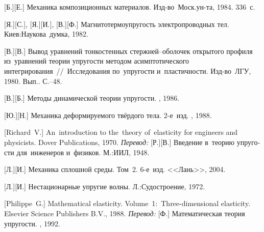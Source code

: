 \begin{thebibliography}{123}
\begin{otherlanguage}{russian}
[Б.][Е.] Механика композиционных материалов. Изд\hbox{-}во~Моск.\:ун\hbox{-}та, 1984. 336~с.

[Я.][С.], [Я.][И.], [В.][Ф.] Магнито\-термо\-упру\-гость электропроводных тел. Киев:\;Наукова~думка, 1982. 

[В.][В.] Вывод уравнений тонко\-стен\-ных стержней\hbox{--}обо\-ло\-чек открытого профиля из~уравнений теории упругости методом асимптотического интегрирования~//~Исследования по~упругости и~пластичности. Изд\hbox{-}во~ЛГУ, 1980. Вып.. С.\hbox{--}48.

[В.][Б.] Методы динамической теории упругости. \naukapublisher, 1986. 

[Ю.][Н.] Механика деформируемого твёрдого тела. 2\hbox{-}е~изд. \naukapublisher, 1988. 

[Richard~V.] An~introduction to the~theory of~elasticity for engineers and physicists. Dover Publications, 1970. 
\emph{Перевод:} [Р.][В.] Введение в~теорию упругости для~инженеров и~физиков. М.:\;ИИЛ, 1948. 

[Л.][И.] Механика сплошной среды. Том~2. 6\hbox{-}е~изд. <<Лань>>, 2004. 

[Л.][И.] Нестационарные упругие волны. Л.:\;Судостроение, 1972. 

[Philippe~G.] Mathematical elasticity. Volume~1:~Three\hbox{-}di\-men\-sion\-al elasticity. Elsevier Science Publishers B.\hspace{.1ex}V., 1988.  %
\emph{Перевод:} [Ф.] Математическая теория упругости. \mirpublisher, 1992. 


\end{otherlanguage}
\end{thebibliography}
